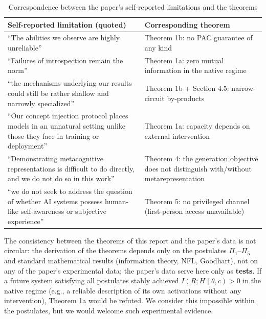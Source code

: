 \begin{table}[htbp]
\centering
\caption{Correspondence between the paper's self-reported limitations and the theorems
\label{tab:paper-thm}}
\begin{tabular}{p{7.2cm}p{6.2cm}}
\toprule
Self-reported limitation (quoted) & Corresponding theorem \\
\midrule
``The abilities we observe are highly unreliable'' & Theorem 1b: no PAC guarantee of any kind \\
``Failures of introspection remain the norm'' & Theorem 1a: zero mutual information in the native regime \\
``the mechanisms underlying our results could still be rather shallow and narrowly specialized'' & Theorem 1b + Section 4.5: narrow-circuit by-products \\
``Our concept injection protocol places models in an unnatural setting unlike those they face in training or deployment'' & Theorem 1a: capacity depends on external intervention \\
``Demonstrating metacognitive representations is difficult to do directly, and we do not do so in this work'' & Theorem 4: the generation objective does not distinguish with/without metarepresentation \\
``we do not seek to address the question of whether AI systems possess human-like self-awareness or subjective experience'' & Theorem 5: no privileged channel (first-person access unavailable) \\
\bottomrule
\end{tabular}
\end{table}

\begin{remark}
The consistency between the theorems of this report and the paper's data is not circular: the
derivation of the theorems depends only on the postulates $\Pi_1$--$\Pi_5$ and standard
mathematical results (information theory, NFL, Goodhart), not on any of the paper's
experimental data; the paper's data serve here only as \textbf{tests}. If a future system
satisfying all postulates stably achieved $I(R;H\mid\theta,c) > 0$ in the native regime
(e.g., a reliable description of its own activations without any intervention), Theorem 1a
would be refuted. We consider this impossible within the
postulates, but we would welcome such experimental evidence.
\end{remark}

\clearpage
